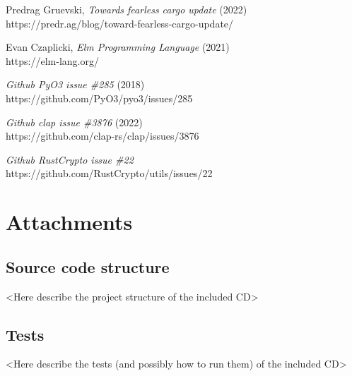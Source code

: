 \documentclass[licencjacka,en]{pracamgr}
\begin{document}
\begin{thebibliography}{99}
 Predrag Gruevski,
    \textit{Towards fearless cargo update} (2022) \\
    https://predr.ag/blog/toward-fearless-cargo-update/

 Evan Czaplicki,
    \textit{Elm Programming Language} (2021) \\
    https://elm-lang.org/

    \textit{Github PyO3 issue \#285} (2018) \\
    https://github.com/PyO3/pyo3/issues/285

    \textit{Github clap issue \#3876} (2022) \\
    https://github.com/clap-rs/clap/issues/3876

    \textit{Github RustCrypto issue \#22} \\
    https://github.com/RustCrypto/utils/issues/22

\end{thebibliography}

\chapter*{Attachments}\label{r:chapter_attachments}

\section*{Source code structure}

<Here describe the project structure of the included CD>


\section*{Tests}

<Here describe the tests (and possibly how to run them) of the included CD>
\end{document}
